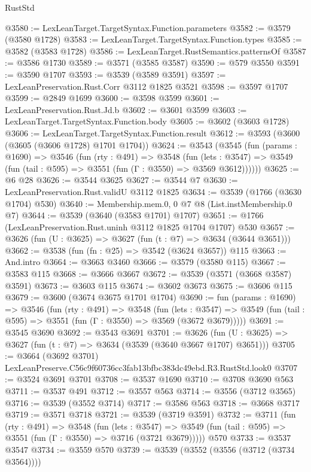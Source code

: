 \begin{lexlean}{RustStd}
\begin{coremodule}
@3580 := LexLeanTarget.TargetSyntax.Function.parameters
@3582 := @3579 (@3580 @1728)
@3583 := LexLeanTarget.TargetSyntax.Function.types
@3585 := @3582 (@3583 @1728)
@3586 := LexLeanTarget.RustSemantics.patternsOf
@3587 := @3586 @1730
@3589 := @3571 (@3585 @3587)
@3590 := @579 @3550
@3591 := @3590 @1707
@3593 := @3539 (@3589 @3591)
@3597 := LexLeanPreservation.Rust.Corr @3112 @1825 @3521
@3598 := @3597 @1707
@3599 := @2849 @1699
@3600 := @3598 @3599
@3601 := LexLeanPreservation.Rust.Jd.b
@3602 := @3601 @3599
@3603 := LexLeanTarget.TargetSyntax.Function.body
@3605 := @3602 (@3603 @1728)
@3606 := LexLeanTarget.TargetSyntax.Function.result
@3612 := @3593 (@3600 (@3605 (@3606 @1728) @1701 @1704))
@3624 := @3543
    (@3545
      (fun (params : @1690) =>
      @3546
        (fun (rty : @491) =>
        @3548
          (fun (lets : @3547) =>
          @3549 (fun (tail : @595) => @3551 (fun (Γ : @3550) => @3569 @3612))))))
@3625 := @6 @28
@3626 := @3544 @3625
@3627 := @3544 @7
@3630 := LexLeanPreservation.Rust.validU @3112 @1825
@3634 := @3539 (@1766 (@3630 @1704) @530)
@3640 := Membership.mem.{0, 0} @7 @8 (List.instMembership.{0} @7)
@3644 := @3539 (@3640 (@3583 @1701) @1707)
@3651 := @1766 (LexLeanPreservation.Rust.uninh @3112 @1825 @1704 @1707) @530
@3657 := @3626 (fun (U : @3625) => @3627 (fun (t : @7) => @3634 (@3644 @3651)))
@3662 := @3538 (fun (fn : @25) => @3542 (@3624 @3657)) @115
@3663 := And.intro
@3664 := @3663 @3460
@3666 := @3579 (@3580 @115)
@3667 := @3583 @115
@3668 := @3666 @3667
@3672 := @3539 (@3571 (@3668 @3587) @3591)
@3673 := @3603 @115
@3674 := @3602 @3673
@3675 := @3606 @115
@3679 := @3600 (@3674 @3675 @1701 @1704)
@3690 := fun (params : @1690) =>
  @3546
    (fun (rty : @491) =>
    @3548
      (fun (lets : @3547) =>
      @3549 (fun (tail : @595) => @3551 (fun (Γ : @3550) => @3569 (@3672 @3679)))))
@3691 := @3545 @3690
@3692 := @3543 @3691
@3701 := @3626 (fun (U : @3625) => @3627 (fun (t : @7) => @3634 (@3539 (@3640 @3667 @1707) @3651)))
@3705 := @3664 (@3692 @3701) LexLeanPreserve.C56c9f60736cc3fab13bfbc383dc49ebd.R3.RustStd.look0
@3707 := @3524 @3691 @3701
@3708 := @3537 @1690
@3710 := @3708 @3690 @563
@3711 := @3537 @491
@3712 := @3557 @563
@3714 := @3556 (@3712 @3565)
@3716 := @3539 (@3552 @3714)
@3717 := @3586 @563
@3718 := @3668 @3717
@3719 := @3571 @3718
@3721 := @3539 (@3719 @3591)
@3732 := @3711
    (fun (rty : @491) =>
    @3548
      (fun (lets : @3547) =>
      @3549 (fun (tail : @595) => @3551 (fun (Γ : @3550) => @3716 (@3721 @3679)))))
    @570
@3733 := @3537 @3547
@3734 := @3559 @570
@3739 := @3539 (@3552 (@3556 (@3712 (@3734 @3564))))

\end{coremodule}
\end{lexlean}
